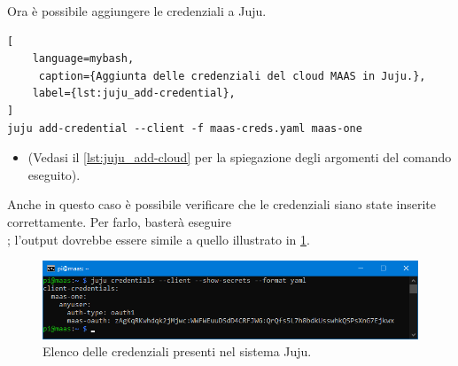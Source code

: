 \bigskip\noindent
Ora è possibile aggiungere le credenziali a Juju.
% 
\begin{lstlisting}[
    language=mybash, 
     caption={Aggiunta delle credenziali del cloud MAAS in Juju.}, 
    label={lst:juju_add-credential},
]
juju add-credential --client -f maas-creds.yaml maas-one
\end{lstlisting}
% 
\begin{itemize}
    \item[] (Vedasi il \cref{lst:juju_add-cloud} per la spiegazione degli argomenti del comando eseguito).
\end{itemize}
% 
Anche in questo caso è possibile verificare che le credenziali siano state inserite correttamente.
% 
Per farlo, basterà eseguire \\; l'output dovrebbe essere simile a quello illustrato in \cref{fig:juju_credentials}.
% 
\begin{figure}[H]
    \centering
    \includegraphics[width=1\linewidth]{tesi/files/immagini/juju/juju credentials}
    \caption{Elenco delle credenziali presenti nel sistema Juju.}
    \label{fig:juju_credentials}
\end{figure}

\bigskip
